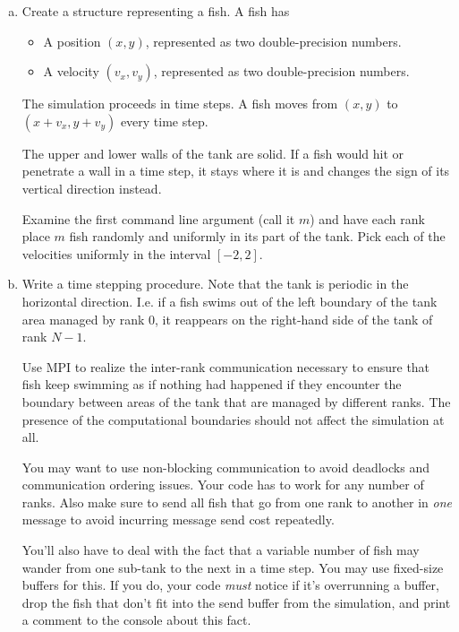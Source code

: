 \documentclass[11pt]{article}
\begin{document}
\begin{enumerate}[a)]
  \item Create a structure representing a fish. A fish has
    \begin{itemize}
      \item A position $(x,y)$, represented as two double-precision
        numbers.
      \item A velocity $(v_x,v_y)$, represented as two double-precision
        numbers.
    \end{itemize}
    The simulation proceeds in time steps. A fish moves from $(x,y)$
    to $(x+v_x, y+v_y)$ every time step.

    The upper and lower walls of the tank are solid. If a fish would
    hit or penetrate a wall in a time step, it stays where it is and
    changes the sign of its vertical direction instead.

    Examine the first command line argument (call it $m$) and have
    each rank place $m$ fish randomly and uniformly in its part of the
    tank. Pick each of the velocities uniformly in the interval
    $[-2,2]$.

  \item Write a time stepping procedure. Note that the tank is
    periodic in the horizontal direction. I.e. if a fish swims out of
    the left boundary of the tank area managed by rank $0$, it
    reappears on the right-hand side of the tank of rank $N-1$.

    Use MPI to realize the inter-rank communication necessary to
    ensure that fish keep swimming as if nothing had happened if they
    encounter the boundary between areas of the tank that are managed
    by different ranks. The presence of the computational boundaries
    should not affect the simulation at all.

    You may want to use non-blocking communication to avoid deadlocks
    and communication ordering issues. Your code has to work for any
    number of ranks. Also make sure to send all fish that go from one
    rank to another in \emph{one} message to avoid incurring message
    send cost repeatedly.

    You'll also have to deal with the fact that a variable number of
    fish may wander from one sub-tank to the next in a time step.
    You may use fixed-size buffers for this. If you do, your code
    \emph{must} notice if it's overrunning a buffer, drop the fish
    that don't fit into the send buffer from the simulation, and print
    a comment to the console about this fact.


\end{enumerate}
\end{document}
